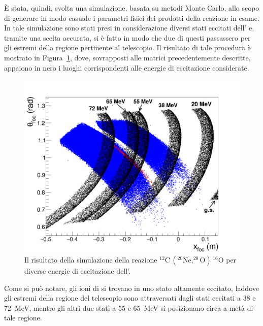 È stata, quindi, svolta una simulazione, basata su metodi Monte Carlo, allo scopo di generare in modo casuale i parametri fisici dei prodotti della reazione in esame.
In tale simulazione sono stati presi in considerazione diversi stati eccitati dell' e, tramite una scelta accurata, si è fatto in modo che due di questi passassero per gli estremi della regione pertinente al telescopio.
Il risultato di tale procedura è mostrato in Figura~\ref{fig:simulazione}, dove, sovrapposti alle matrici precedentemente descritte, appaiono in nero i luoghi corrispondenti alle energie di eccitazione considerate.
\begin{figure} [!p]
	\centering
	\includegraphics[width=\textwidth, keepaspectratio]{Grafici_Tesi/Test/simulazione.png}
	\caption{Il risultato della simulazione della reazione $^{12}\mbox{C}\,  ( ^{20}\mbox{Ne}, ^{20}\mbox{O} ) \, ^{16}\mbox{O} $ per diverse energie di eccitazione dell'.} \label{fig:simulazione}
\end{figure}
Come si può notare, gli ioni di  si trovano in uno stato altamente eccitato, laddove gli estremi della regione del telescopio sono attraversati dagli stati eccitati a 38 e 72~MeV, mentre gli altri due stati a 55 e 65~MeV si posizionano circa a metà di tale regione.
